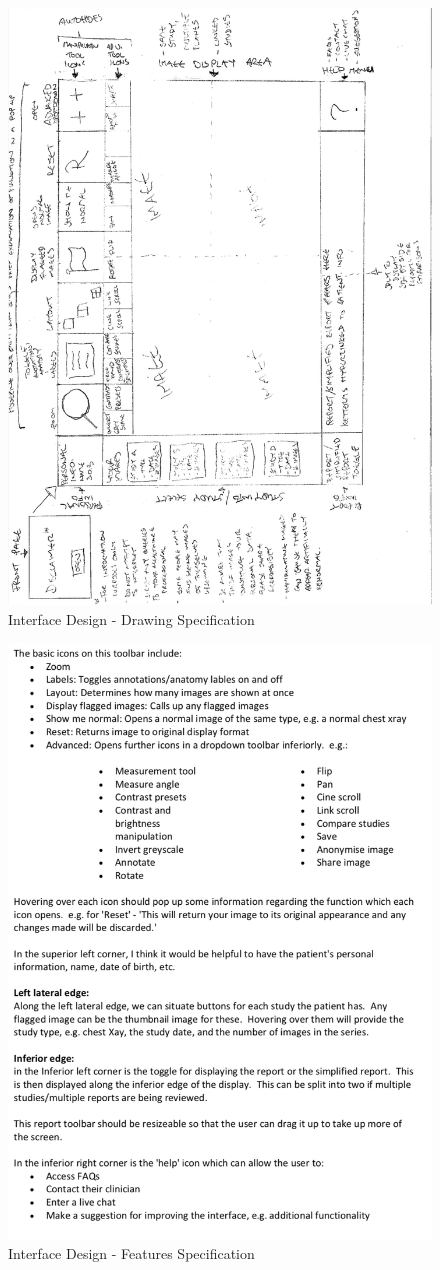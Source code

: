 \begin{figure}[ht]
\centering
\includegraphics[width = 0.80\hsize]{./figures/InterfaceDesign}
\caption{Interface Design - Drawing Specification}
\end{figure}

\begin{figure}[ht]
\centering
\includegraphics[width = 0.80\hsize]{./figures/DesignSpec}
\caption{Interface Design - Features Specification}
\end{figure}